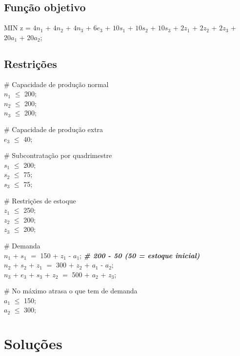 \documentclass{article}
\begin{document}
\subsection{Função objetivo}
MIN z = $4n_1$ + $4n_2$ + $4n_3$ + $6e_3$ + $10s_1$ + $10s_2$ + $10s_3$ + $2z_1$ + $2z_2$ + $2z_3$ + $20a_1$ + $20a_2$;



\subsection{Restrições}

\# Capacidade de produção normal \\
$n_1$ $\le$ 200; \\
$n_2$ $\le$ 200; \\
$n_3$ $\le$ 200; 

\vspace{1cm}

\# Capacidade de produção extra \\
$e_3$ $\le$ 40;

\vspace{1cm}


\# Subcontratação por quadrimestre \\
$s_1$ $\le$ 200; \\
$s_2$ $\le$ 75; \\
$s_3$ $\le$ 75; 

\vspace{1cm}

\# Restrições de estoque \\
$z_1$ $\le$ 250; \\
$z_2$ $\le$ 200; \\
$z_3$ $\le$ 200;

\vspace{1cm}

\# Demanda \\
$n_1$ + $s_1$ $=$ 150 + $z_1$ - $a_1$; \textit{\textbf{\# 200 - 50 (50 = estoque inicial)}} \\
$n_2$ + $s_2$ + $z_1$ $=$ 300 + $z_2$ + $a_1$ - $a_2$; \\
$n_3$ + $e_3$ + $s_3$ + $z_2$ $=$ 500 + $a_2$ + $z_3$;

\vspace{1cm}

\# No máximo atrasa o que tem de demanda \\
$a_1$ $\le$ 150; \\
$a_2$ $\le$ 300;


\section{Soluções}
\end{document}
